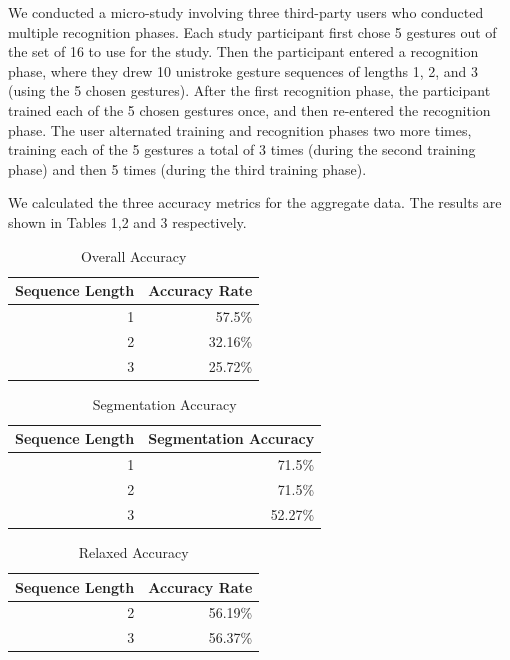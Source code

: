 \documentclass[twoside]{article}
\begin{document}
\begin{multicols}{2}
We conducted a micro-study involving three third-party users who conducted
multiple recognition phases. Each study participant first chose 5 gestures out
of the set of 16 to use for the study. Then the participant entered a
recognition phase, where they drew 10 unistroke gesture sequences of lengths 1,
2, and 3 (using the 5 chosen gestures). After the first recognition phase, the participant trained each of the
5 chosen gestures once, and then re-entered the recognition phase. The user
alternated training and recognition phases two more times, training each of the
5 gestures a total of 3 times (during the second training phase) and then 5 times (during the third training phase).

We calculated the three accuracy metrics for the aggregate data. The results are shown in Tables 1,2 and 3 respectively.

\begin{table}[H]
  \centering
  \caption{Overall Accuracy}
    \begin{tabular}{rr}
    \toprule
    Sequence Length & Accuracy Rate \\
    \midrule
    1     & 57.5\% \\
    2     & 32.16\% \\
    3     & 25.72\% \\
    \bottomrule
    \end{tabular}%
  \label{tab:addlabel}%
\end{table}%

\begin{table}[H]
  \centering
  \caption{Segmentation Accuracy}
    \begin{tabular}{rr}
    \toprule
	Sequence Length & Segmentation Accuracy \\
    \midrule
    1     & 71.5\% \\
    2     & 71.5\% \\
    3     & 52.27\% \\
    \bottomrule
    \end{tabular}%
  \label{tab:addlabel}%
\end{table}%

\begin{table}[H]
  \centering
  \caption{Relaxed Accuracy}
    \begin{tabular}{rr}
    \toprule
    Sequence Length & Accuracy Rate \\
    \midrule
    2     & 56.19\% \\
    3     & 56.37\% \\
    \bottomrule
    \end{tabular}%
  \label{tab:addlabel}%
\end{table}%


\end{multicols}
\end{document}
